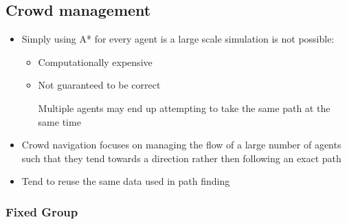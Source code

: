 \documentclass[a4paper]{article}
\begin{document}
\subsection{Crowd management}

\begin{itemize}
  \item
    Simply using A* for every agent is a large scale simulation is not possible:
    \begin{itemize}
      \item
        Computationally expensive

      \item
        Not guaranteed to be correct

        Multiple agents may end up attempting to take the same path at the same
        time

    \end{itemize}

  \item
    Crowd navigation focuses on managing the flow of a large number of agents
    such that they tend towards a direction rather then following an exact path

  \item
    Tend to reuse the same data used in path finding

\end{itemize}

\subsubsection{Fixed Group}
\end{document}
